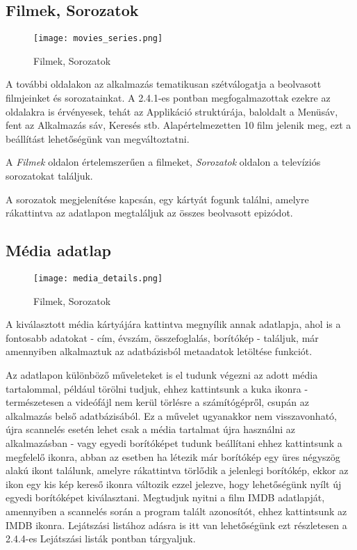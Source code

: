 \subsection{Filmek, Sorozatok}
\begin{figure}[H]
	\centering
	\texttt{[image: movies\_series.png]}
	\caption{Filmek, Sorozatok}
	\label{fig:movies_series}
\end{figure}
A további oldalakon az alkalmazás tematikusan szétválogatja a beolvasott filmjeinket és sorozatainkat. A 2.4.1-es pontban megfogalmazottak ezekre az oldalakra is érvényesek, tehát az Applikáció struktúrája, baloldalt a Menüsáv, fent az Alkalmazás sáv, Keresés stb. Alapértelmezetten 10 film jelenik meg, ezt a beállítást lehetőségünk van megváltoztatni.

A {\it Filmek} oldalon értelemszerűen a filmeket, {\it Sorozatok} oldalon a televíziós sorozatokat találjuk.

A sorozatok megjelenítése kapcsán, egy kártyát fogunk találni, amelyre rákattintva az adatlapon megtaláljuk az összes beolvasott epizódot.

\subsection{Média adatlap}
\begin{figure}[H]
	\centering
	\texttt{[image: media\_details.png]}
	\caption{Filmek, Sorozatok}
	\label{fig:media_details}
\end{figure}
A kiválasztott média kártyájára kattintva megnyílik annak adatlapja, ahol is a fontosabb adatokat - cím, évszám, összefoglalás, borítókép - találjuk, már amennyiben alkalmaztuk az adatbázisból metaadatok letöltése funkciót.

Az adatlapon különböző műveleteket is el tudunk végezni az adott média tartalommal, például törölni tudjuk, ehhez kattintsunk a kuka ikonra - természetesen a videófájl nem kerül törlésre a számítógépről, csupán az alkalmazás belső adatbázisából. Ez a művelet ugyanakkor nem visszavonható, újra scannelés esetén lehet csak a média tartalmat újra használni az alkalmazásban - vagy egyedi borítóképet tudunk beállítani ehhez kattintsunk a megfelelő ikonra, abban az esetben ha létezik már borítókép egy üres négyszög alakú ikont találunk, amelyre rákattintva törlődik a jelenlegi borítókép, ekkor az ikon egy kis kép kereső ikonra változik ezzel jelezve, hogy lehetőségünk nyílt új egyedi borítóképet kiválasztani. Megtudjuk nyitni a film IMDB adatlapját, amennyiben a scannelés során a program talált azonosítót, ehhez kattintsunk az IMDB ikonra. Lejátszási listához adásra is itt van lehetőségünk ezt részletesen a 2.4.4-es Lejátszási listák pontban tárgyaljuk.

